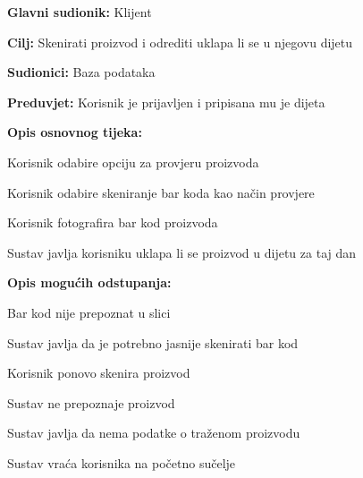 					\noindent {}
					\begin{packed_item}
						
						\item \textbf{Glavni sudionik:} Klijent
						\item  \textbf{Cilj:} Skenirati proizvod i odrediti uklapa li se u njegovu dijetu
						\item  \textbf{Sudionici:} Baza podataka
						\item  \textbf{Preduvjet:} Korisnik je prijavljen i pripisana mu je dijeta
						\item  \textbf{Opis osnovnog tijeka:}
						
						\item[] \begin{packed_enum}
							
							\item Korisnik odabire opciju za provjeru proizvoda
							\item Korisnik odabire skeniranje bar koda kao način provjere
							\item Korisnik fotografira bar kod proizvoda
							\item Sustav javlja korisniku uklapa li se proizvod u dijetu za taj dan
							
						\end{packed_enum}
						
						\item  \textbf{Opis mogućih odstupanja:}
						
						\item[] \begin{packed_item}
							
							\item[2.a] Bar kod nije prepoznat u slici
							\item[] \begin{packed_enum}
								
								\item Sustav javlja da je potrebno jasnije skenirati bar kod
								\item Korisnik ponovo skenira proizvod
								
							\end{packed_enum}
						
							\item[2.b] Sustav ne prepoznaje proizvod
							\item[] \begin{packed_enum}
								
								\item Sustav javlja da nema podatke o traženom proizvodu
								\item Sustav vraća korisnika na početno sučelje
								
							\end{packed_enum}
							
						\end{packed_item}
						
					\end{packed_item}
				
